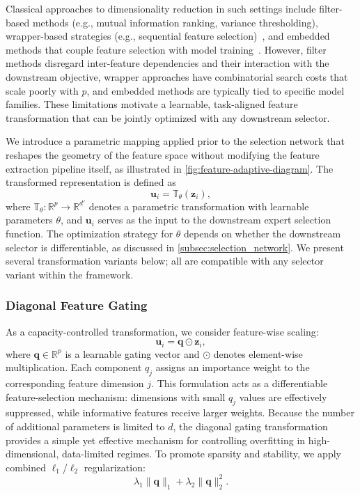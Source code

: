 \documentclass[journal]{IEEEtran}
\begin{document}
    Classical approaches to dimensionality reduction in such settings include filter-based
    methods (e.g., mutual information ranking, variance thresholding), wrapper-based
    strategies (e.g., sequential feature selection)~\cite{guyon2003introduction,kohavi1997wrappers}, and embedded methods that
    couple feature selection with model training~\cite{friedman2001}. However,
    filter methods disregard inter-feature dependencies and their interaction
    with the downstream objective, wrapper approaches have combinatorial search costs
    that scale poorly with $p$, and embedded methods are typically tied to
    specific model families. These limitations motivate a learnable, task-aligned
    feature transformation that can be jointly optimized with any downstream
    selector.

    We introduce a parametric mapping applied prior to the selection network
    that reshapes the geometry of the feature space without modifying the
    feature extraction pipeline itself, as illustrated in \cref{fig:feature-adaptive-diagram}.
    The transformed representation is defined as
    \[
        \mathbf{u}_{i}= \mathbb{T}_{\theta}(\mathbf{z}_{i}),
    \]
    where $\mathbb{T}_{\theta}: \mathbb{R}^{p}\rightarrow \mathbb{R}^{d'}$
    denotes a parametric transformation with learnable parameters $\theta$, and $\mathbf{u}
    _{i}$ serves as the input to the downstream expert selection function. The
    optimization strategy for $\theta$ depends on whether the downstream
    selector is differentiable, as discussed in \cref{subsec:selection_network}.
    We present several transformation variants below; all are compatible with any
    selector variant within the framework.

    \subsubsection{Diagonal Feature Gating}

    As a capacity-controlled transformation, we consider feature-wise scaling:
\[
\mathbf{u}_i = \mathbf{q} \odot \mathbf{z}_i,
\]
    where $\mathbf{q}\in \mathbb{R}^{p}$ is a learnable gating vector and
    $\odot$ denotes element-wise multiplication. Each component $q_{j}$ assigns an
    importance weight to the corresponding feature dimension $j$. This
    formulation acts as a differentiable feature-selection mechanism: dimensions
    with small $q_{j}$ values are effectively suppressed, while informative
    features receive larger weights. Because the number of additional parameters
    is limited to $d$, the diagonal gating transformation provides a simple yet
    effective mechanism for controlling overfitting in high-dimensional, data-limited
    regimes. To promote sparsity and stability, we apply combined $\ell_{1}$/$\ell
    _{2}$ regularization:
    \[
        \lambda_{1}\|\mathbf{q}\|_{1}+ \lambda_{2}\|\mathbf{q}\|_{2}^{2}.
    \]
\end{document}
